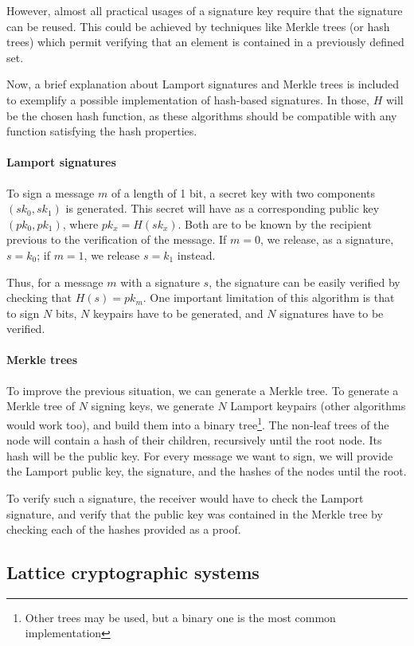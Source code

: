 However, almost all practical usages of a signature key require that the signature can be reused. This
could be achieved by techniques like Merkle trees (or hash trees) which permit verifying that an element
is contained in a previously defined set.

Now, a brief explanation about Lamport signatures and Merkle trees is included to exemplify a possible
implementation of hash-based signatures. In those, $H$ will be the chosen hash function, as these
algorithms should be compatible with any function satisfying the hash properties.

\paragraph{Lamport signatures}
To sign a message $m$ of a length of 1 bit, a secret key with two components $(sk_0, sk_1)$ is generated.
This secret will have as a corresponding public key $(pk_0, pk_1)$, where $pk_x = H(sk_x)$.
Both are to be known by the recipient previous to the verification of the message. If $m = 0$, we release,
as a signature, $s = k_0$;  if $m = 1$, we release $s = k_1$ instead.

Thus, for a message $m$ with a
signature $s$, the signature can be easily verified by checking that $H(s) = pk_m$. One important
limitation of this algorithm is that to sign $N$ bits, $N$ keypairs have to be generated, and $N$
signatures have to be verified.

\paragraph{Merkle trees}
To improve the previous situation, we can generate a Merkle tree. To generate a Merkle tree of $N$
signing keys, we generate $N$ Lamport keypairs (other algorithms would work too), and build them into
a binary tree\footnote{Other trees may be used, but a binary one is the most common implementation}.
The non-leaf trees of the node will contain a hash of their children, recursively until the root node. Its
hash will be the public key. For every message we want to sign, we will provide the Lamport public key, the
signature, and the hashes of the nodes until the root.

To verify such a signature, the receiver would have to check the Lamport signature, and verify
that the public key was contained in the Merkle tree by checking each of the hashes provided as a
proof.

\pagebreak
\subsection{ Lattice cryptographic systems }

